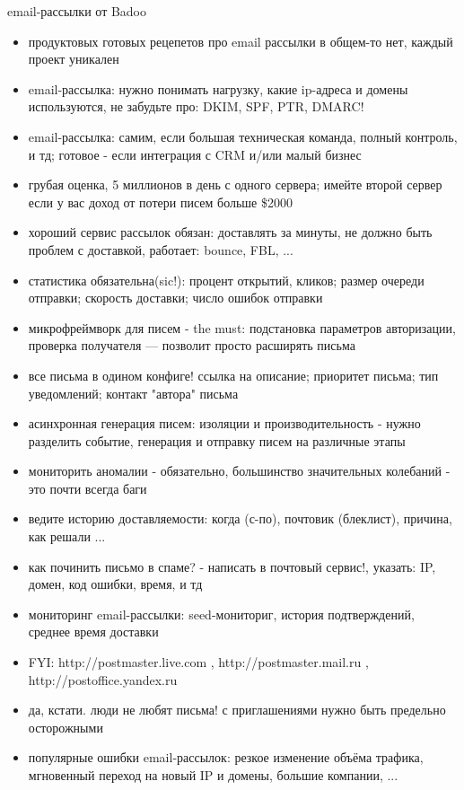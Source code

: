 \documentclass[aspectratio=169]{beamer}
\begin{document}
\begin{frame}{email-рассылки от Badoo}
\begin{itemize}
  \item продуктовых готовых рецепетов про email рассылки в общем-то нет, каждый проект уникален
  \item email-рассылка: нужно понимать нагрузку, какие ip-адреса и домены используются, не забудьте про: DKIM, SPF, PTR, DMARC!
  \item email-рассылка: самим, если большая техническая команда, полный контроль, и тд; готовое - если интеграция с CRM и/или малый бизнес
  \item грубая оценка, 5 миллионов в день с одного сервера; имейте второй сервер если у вас доход от потери писем больше \$2000
  \item хороший сервис рассылок обязан: доставлять за минуты, не должно быть проблем с доставкой, работает: bounce, FBL, ...
  \item статистика обязательна(sic!): процент открытий, кликов; размер очереди отправки; скорость доставки; число ошибок отправки
  \item микрофреймворк для писем - the must: подстановка параметров авторизации, проверка получателя --- позволит просто расширять письма
  \item все письма в одином конфиге! ссылка на описание; приоритет письма; тип уведомлений; контакт "автора" письма
  \item асинхронная генерация писем: изоляции и производительность - нужно разделить событие, генерация и отправку писем на различные этапы
  \item мониторить аномалии - обязательно, большинство значительных колебаний - это почти всегда баги
  \item ведите историю доставляемости: когда (с-по), почтовик (блеклист), причина, как решали ...
  \item как починить письмо в спаме? - написать в почтовый сервис!, указать: IP, домен, код ошибки, время, и тд
  \item мониторинг email-рассылки: seed-мониториг, история подтверждений, среднее время доставки
  \item FYI: http://postmaster.live.com , http://postmaster.mail.ru , http://postoffice.yandex.ru 
  \item да, кстати. люди не любят письма! с приглашениями нужно быть предельно осторожными
  \item популярные ошибки email-рассылок: резкое изменение объёма трафика, мгновенный переход на новый IP и домены, большие компании, ...
\end{itemize}
\end{frame}
  
\end{document}
